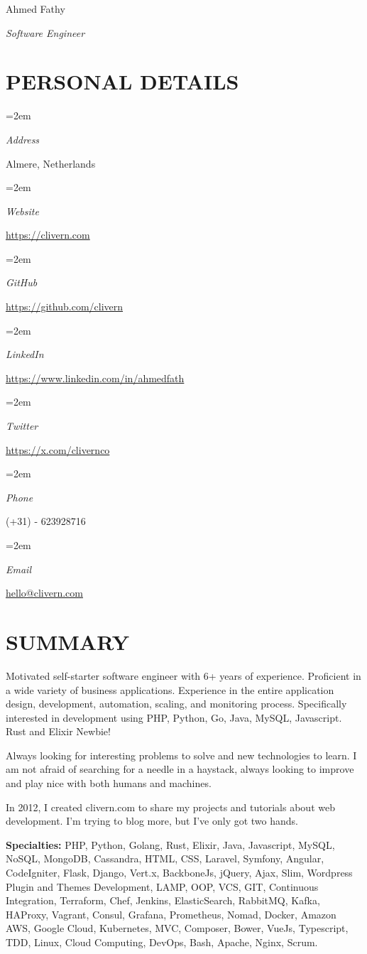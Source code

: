 \documentclass[paper=a4,fontsize=11pt]{scrartcl} %
\newlength{\spacebox}
\newcommand{\sepspace}{\vspace*{1em}}		%
\newcommand{\MyName}[1]{ %
		\Huge \usefont{OT1}{phv}{b}{n} \hfill #1
		\par \normalsize \normalfont}
\newcommand{\MySlogan}[1]{ %
		\large \usefont{OT1}{phv}{m}{n}\hfill \textit{#1}
		\par \normalsize \normalfont}
\newcommand{\NewPart}[1]{\section*{\uppercase{#1}}}
\newcommand{\PersonalEntry}[2]{
		\noindent\hangindent=2em\hangafter=0 %
		\parbox{\spacebox}{        %
		\textit{#1}}		       %
		\hspace{1.5em} #2 \par}    %
\begin{document}

\MyName{Ahmed Fathy}
\MySlogan{Software Engineer}

\sepspace


\NewPart{Personal details}{}

\PersonalEntry{Address}{Almere, Netherlands}
\PersonalEntry{Website}{\url{https://clivern.com}}
\PersonalEntry{GitHub}{\url{https://github.com/clivern}}
\PersonalEntry{LinkedIn}{\url{https://www.linkedin.com/in/ahmedfath}}
\PersonalEntry{Twitter}{\url{https://x.com/clivernco}}
\PersonalEntry{Phone}{(+31) - 623928716}
\PersonalEntry{Email}{\url{hello@clivern.com}}


\NewPart{Summary}{}

Motivated self-starter software engineer with 6+ years of experience. Proficient in a wide variety of business applications. Experience in the entire application design, development, automation, scaling, and monitoring process.
Specifically interested in development using PHP, Python, Go, Java, MySQL, Javascript. Rust and Elixir Newbie!

\sepspace

Always looking for interesting problems to solve and new technologies to learn. I am not afraid of searching for a needle in a haystack, always looking to improve and play nice with both humans and machines.

\sepspace

In 2012, I created clivern.com to share my projects and tutorials about web development. I'm trying to blog more, but I've only got two hands.

\sepspace

\textbf{Specialties:} PHP, Python, Golang, Rust, Elixir, Java, Javascript, MySQL, NoSQL, MongoDB, Cassandra, HTML, CSS, Laravel, Symfony, Angular, CodeIgniter, Flask, Django, Vert.x, BackboneJs, jQuery, Ajax, Slim, Wordpress Plugin and Themes Development, LAMP, OOP, VCS, GIT, Continuous Integration, Terraform, Chef, Jenkins, ElasticSearch, RabbitMQ, Kafka, HAProxy, Vagrant, Consul, Grafana, Prometheus, Nomad, Docker, Amazon AWS, Google Cloud, Kubernetes, MVC, Composer, Bower, VueJs, Typescript, TDD, Linux, Cloud Computing, DevOps, Bash, Apache, Nginx, Scrum.
\end{document}
